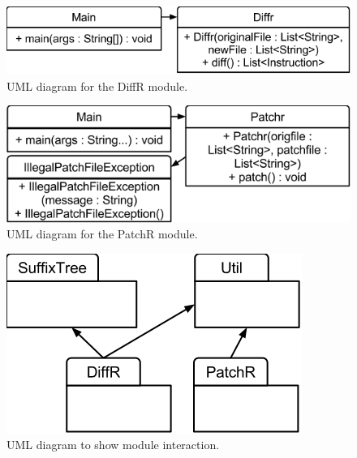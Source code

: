 \begin{figure}[H]
\begin{center}
\includegraphics[width=\textwidth]{design/diffrUML-diffR.png}
\end{center}
\caption{UML diagram for the DiffR module.}
\label{fig:diffrUML}
\end{figure}

\begin{figure}[H]
\begin{center}
\includegraphics[width=\textwidth]{design/diffrUML-patchR.png}
\end{center}
\caption{UML diagram for the PatchR module.}
\label{fig:patchrUML}
\end{figure}

\begin{figure}[H]
\begin{center}
\includegraphics[width=\textwidth]{design/diffrUML-packages.png}
\end{center}
\caption{UML diagram to show module interaction.}
\label{fig:packagesUML}
\end{figure}


